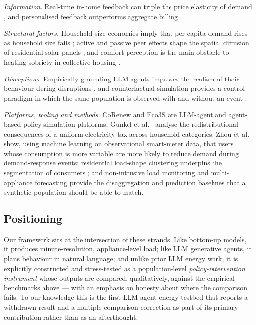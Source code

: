 \documentclass[11pt]{article}
\begin{document}
\noindent\emph{Information.} Real-time in-home feedback can triple the price elasticity of demand
\cite{jessoe2012}, and personalised feedback outperforms aggregate billing \cite{monacchi2015}.

\noindent\emph{Structural factors.} Household-size economies imply that per-capita demand rises as
household size falls \cite{schroder2013}; active and passive peer effects shape the spatial diffusion of
residential solar panels \cite{barnes2022}; and comfort perception is the main obstacle to heating
sobriety in collective housing \cite{cabezas2025}.

\noindent\emph{Disruptions.} Empirically grounding LLM agents improves the realism of their behaviour
during disruptions \cite{xia2026}, and counterfactual simulation provides a control paradigm in which the
same population is observed with and without an event \cite{fidone2025}.

\noindent\emph{Platforms, tooling and methods.} CoRenew \cite{zhang2026} and Eco3S \cite{wei2026} are
LLM-agent and agent-based policy-simulation platforms; Gunkel et al.\ \cite{gunkel2023} analyse the
redistributional consequences of a uniform electricity tax across household categories; Zhou et al.\
\cite{zhou2016} show, using machine learning on observational smart-meter data, that users whose
consumption is more variable are more likely to reduce demand during demand-response events; residential
load-shape clustering underpins the segmentation of consumers \cite{jin2021}; and non-intrusive load
monitoring and multi-appliance forecasting provide the disaggregation and prediction baselines that a
synthetic population should be able to match.

\subsection{Positioning}
Our framework sits at the intersection of these strands. Like bottom-up models, it produces
minute-resolution, appliance-level load; like LLM generative agents, it plans behaviour in natural
language; and unlike prior LLM energy work, it is explicitly constructed and stress-tested as a
population-level \emph{policy-intervention instrument} whose outputs are compared, qualitatively, against
the empirical benchmarks above --- with an emphasis on honesty about where the comparison fails. To our
knowledge this is the first LLM-agent energy testbed that reports a withdrawn result and a
multiple-comparison correction as part of its primary contribution rather than as an afterthought.
\end{document}
